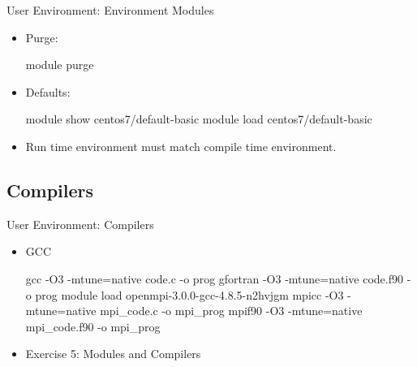 \begin{frame}[fragile]{User Environment: Environment Modules}
\begin{itemize}
\item{Purge:}
\begin{semiverbatim}
\scriptsize
module purge
\end{semiverbatim}
\smallskip
\item{Defaults:}
\begin{semiverbatim}
\scriptsize
module show centos7/default-basic
module load centos7/default-basic
\end{semiverbatim}
\medskip
\item{Run time environment must match compile time environment.}
\end{itemize}
\end{frame}

\subsection{Compilers}
\begin{frame}[fragile]{User Environment: Compilers}
  \begin{itemize}
    \item{GCC}
\begin{semiverbatim}
\scriptsize
gcc -O3 -mtune=native code.c -o prog
gfortran -O3 -mtune=native code.f90 -o prog
\medskip
module load openmpi-3.0.0-gcc-4.8.5-n2hvjgm
mpicc -O3 -mtune=native mpi_code.c -o mpi_prog
mpif90 -O3 -mtune=native mpi_code.f90 -o mpi_prog
\end{semiverbatim}
\pause
\item{Exercise 5: Modules and Compilers}
\end{itemize}
\end{frame}










